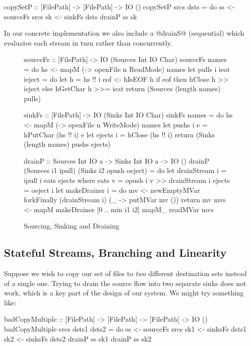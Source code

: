 \begin{code}
 copySetP :: [FilePath] -> [FilePath] -> IO ()
 copySetP srcs dsts
  = do  ss <- sourceFs srcs
        sk <- sinkFs   dsts
        drainP ss sk
\end{code}

In our concrete implementation we also include a @drainS@ (sequential) which evaluates each stream in turn rather than concurrently.
\begin{figure}
\begin{code}
sourceFs :: [FilePath] -> IO (Sources Int IO Char)
sourceFs names 
 = do hs <- mapM (\n -> openFile n ReadMode) names
      let pulls i ieat ieject
          = do let h = hs !! i
               eof <- hIsEOF h
               if eof then hClose   h >> ieject
                      else hGetChar h >>= ieat
      return (Sources (length names) pulls)

sinkFs  :: [FilePath] -> IO (Sinks Int IO Char)
sinkFs names 
 = do hs <- mapM (\n -> openFile n WriteMode) names
      let pushs  i e = hPutChar (hs !! i) e
      let ejects i   = hClose   (hs !! i)
      return (Sinks (length names) pushs ejects)

drainP :: Sources Int IO a -> Sinks Int IO a -> IO ()
drainP (Sources i1 ipull) (Sinks i2 opush oeject) 
 = do let drainStream i
          = ipull i eats ejects 
          where eats v = opush i v >> drainStream i
                ejects = oeject i
      let makeDrainer i 
          = do mv <- newEmptyMVar 
               forkFinally (drainStream i) 
                           (\_ -> putMVar mv ())
               return mv 
      mvs <- mapM makeDrainer [0 .. min i1 i2]
      mapM_ readMVar mvs
\end{code}

\caption{Sourcing, Sinking and Draining}
\label{f:Draining}
\end{figure}


\subsection{Stateful Streams, Branching and Linearity}
\label{s:Linearity}
Suppose we wish to copy our set of files to \emph{two} different destination sets instead of a single one. Trying to drain the source flow into two separate sinks does not work, which is a key part of the design of our system. We might try something like:

\begin{code}
 badCopyMultiple 
  :: [FilePath] -> [FilePath] -> [FilePath] -> IO ()
 badCopyMultiple srcs dsts1 dsts2
  = do  ss  <- sourceFs srcs
        sk1 <- sinksFs  dsts1
        sk2 <- sinksFs  dsts2
        drainP ss sk1
        drainP ss sk2
\end{code}

